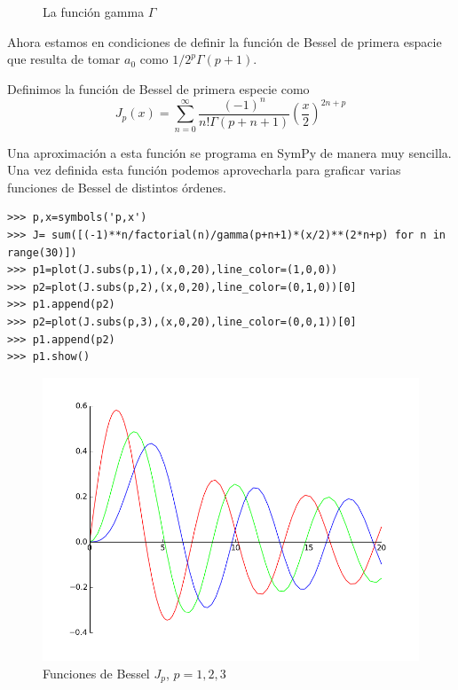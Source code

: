 \documentclass{article}
\begin{document}
\begin{figure}[h]
\caption{La función gamma $\Gamma$}
\end{figure}
Ahora estamos en condiciones de definir la función de Bessel de primera espacie que resulta de tomar $a_0$ como $1/2^p\Gamma(p+1)$.

\begin{definicion}\label{def:bessel_primera} Definimos la función de Bessel de primera especie como
\[J_p(x)=\sum_{n=0}^{\infty}\frac{(-1)^n}{n!\Gamma(p+n+1)}\left(\frac{x}{2}\right)^{2n+p}\]
\end{definicion}


Una aproximación a esta función se programa en SymPy de manera muy sencilla. Una vez definida esta función podemos aprovecharla  para graficar varias funciones de Bessel de distintos órdenes.

\begin{lstlisting}
>>> p,x=symbols('p,x')
>>> J= sum([(-1)**n/factorial(n)/gamma(p+n+1)*(x/2)**(2*n+p) for n in range(30)])
>>> p1=plot(J.subs(p,1),(x,0,20),line_color=(1,0,0))
>>> p2=plot(J.subs(p,2),(x,0,20),line_color=(0,1,0))[0]
>>> p1.append(p2)
>>> p2=plot(J.subs(p,3),(x,0,20),line_color=(0,0,1))[0]
>>> p1.append(p2)
>>> p1.show()
\end{lstlisting}
\begin{figure}[h]
\begin{center}
\includegraphics[scale=.5]{imagenes/bessel.png}
\end{center}

\caption{Funciones de Bessel $J_p$, $p=1,2,3$}\label{fig:bessel}

\end{figure}
\end{document}
